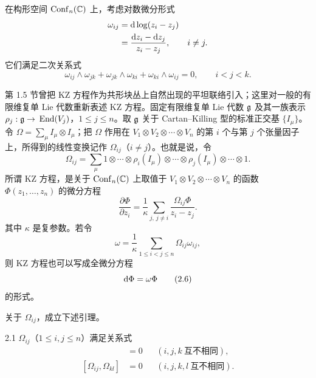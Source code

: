 在构形空间 $\operatorname{Conf}_n(\mathbb{C})$ 上，考虑对数微分形式
\[
\begin{aligned}
  \omega_{ij}&=\mathrm{d}\log(z_i-z_j)\\
  &=\frac{\mathrm{d} z_i-\mathrm{d} z_j}{z_i-z_j},\qquad i\ne j.
\end{aligned}
\]
它们满足二次关系式
\begin{equation}
  \omega_{ij}\wedge\omega_{jk}+\omega_{jk}\wedge\omega_{ki}+\omega_{ki}\wedge\omega_{ij}=0,
  \qquad i<j<k. \tag{2.3}
\end{equation}


第 1.5 节曾把 KZ 方程作为共形块丛上自然出现的平坦联络引入；这里对一般的有限维复单 Lie 代数重新表述 KZ 方程。固定有限维复单 Lie 代数 $\mathfrak{g}$ 及其一族表示 $\rho_j:\mathfrak{g}\to$
$\operatorname{End}(V_j)$，$1\le j\le n$。取 $\mathfrak{g}$ 关于 Cartan--Killing 型的标准正交基 $\{I_\mu\}$。令 $\Omega=\sum_\mu I_\mu\otimes I_\mu$；把 $\Omega$ 作用在 $V_1\otimes V_2\otimes\cdots\otimes V_n$ 的第 $i$ 个与第 $j$ 个张量因子上，所得到的线性变换记作 $\Omega_{ij}$（$i\ne j$）。也就是说，令
\begin{equation}
  \Omega_{ij}=\sum_\mu 1\otimes\cdots\otimes\rho_i(I_\mu)\otimes\cdots\otimes\rho_j(I_\mu)\otimes\cdots\otimes 1. \tag{2.4}
\end{equation}
所谓 KZ 方程，是关于 $\operatorname{Conf}_n(\mathbb{C})$ 上取值于 $V_1\otimes V_2\otimes\cdots\otimes V_n$ 的函数 $\Phi(z_1,\dots,z_n)$ 的微分方程
\begin{equation}
  \frac{\partial\Phi}{\partial z_i}
  =\frac{1}{\kappa}\sum_{j,\,j\ne i}\frac{\Omega_{ij}\Phi}{z_i-z_j}. \tag{2.5}
\end{equation}
其中 $\kappa$ 是复参数。若令
\[
  \omega=\frac{1}{\kappa}\sum_{1\le i<j\le n}\Omega_{ij}\omega_{ij},
\]
则 KZ 方程也可以写成全微分方程
\begin{equation}
  \mathrm{d}\Phi=\omega\Phi \tag{2.6}
\end{equation}
的形式。


关于 $\Omega_{ij}$，成立下述引理。

\begin{lemma*}{2.1}
  $\Omega_{ij}$（$1\le i,j\le n$）满足关系式
  \begin{align}
    [\Omega_{ij}+\Omega_{jk},\Omega_{ik}]&=0 &&(i,j,k\ \text{互不相同}), \tag{2.7}\\
    [\Omega_{ij},\Omega_{kl}]&=0 &&(i,j,k,l\ \text{互不相同}). \tag{2.8}
  \end{align}
\end{lemma*}

